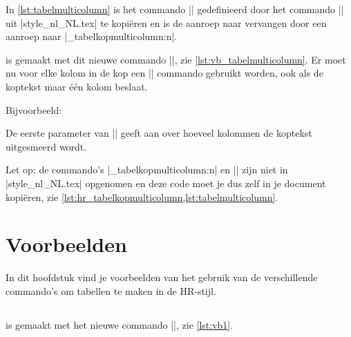 \begin{llstShortInline}
	
	In \cref{lst:tabelmulticolumn} is het commando |\tabelmulticolumn| gedefinieerd door het commando |\tabel| uit |style_nl_NL.tex| te kopiëren en is de aanroep naar  vervangen door een aanroep naar |\hr_tabelkopmulticolumn:n|.
	
	
	 is gemaakt met dit nieuwe commando |\tabelmulticolumn|, zie \cref{lst:vb_tabelmulticolumn}.
	Er moet nu voor elke kolom in de kop een |\multicolumn| commando gebruikt worden, ook als de koptekst maar één kolom beslaat.

	Bijvoorbeeld:	
\begin{lstfragment}[style=lstyle]
	\multicolum{1}{c}{\textcolor{white}{\textbf{koptekst}}
\end{lstfragment}
	De eerste parameter van |\multicolumn| geeft aan over hoeveel kolommen de koptekst uitgesmeerd wordt.
		
	
	
	Let op: de commando's |\hr_tabelkopmulticolumn:n| en |\tabelmulticolumn| zijn niet in |style_nl_NL.tex| opgenomen en deze code moet je dus zelf in je document kopiëren, zie \cref{lst:hr_tabelkopmulticolumn,lst:tabelmulticolumn}.
	
	\section{Voorbeelden}
	In dit hoofdstuk vind je voorbeelden van het gebruik van de verschillende commando's om tabellen te maken in de HR-stijl.
	\subsection{\texorpdfstring{\lcode{\\tabel}}{\textbackslash{}tabel}}
	 is gemaakt met het nieuwe commando |\tabel|, zie \cref{lst:vb1}.
	

\end{llstShortInline}
